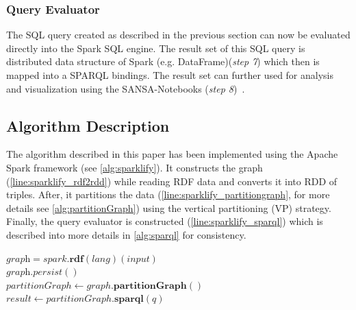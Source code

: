 \subsubsection{Query Evaluator}
The SQL query created as described in the previous section can now be evaluated directly into the Spark SQL engine.
The result set of this SQL query is distributed data structure of Spark (e.g. DataFrame)(\textit{step 7}) which then is mapped into a SPARQL bindings.
The result set can further used for analysis and visualization using the SANSA-Notebooks (\textit{step 8})~\cite{iermilov-2017-sansa-iswc-demo}.

\subsection{Algorithm Description}
\label{subsection:algorithm}
The algorithm described in this paper has been implemented using the Apache Spark framework (see \autoref{alg:sparklify}).
It constructs the graph (\autoref{line:sparklify_rdf2rdd}) while reading RDF data and converts it into RDD of triples.
After, it partitions the data (\autoref{line:sparklify_partitiongraph}, for more details see \autoref{alg:partitionGraph}) using the vertical partitioning (VP) strategy.
Finally, the query evaluator is constructed (\autoref{line:sparklify_sparql}) which is described into more details in \autoref{alg:sparql} for consistency.

\begin{algorithm}[t]
\caption{Sparklify algorithm.}
\label{alg:sparklify}
    $\textit{graph} = spark.\textbf{rdf}(lang)(input)$ \label{line:sparklify_rdf2rdd}\\
    $\textit{graph}.persist()$\\
    $partitionGraph \leftarrow graph.\textbf{partitionGraph}()$ \label{line:sparklify_partitiongraph}\\
    $result \leftarrow partitionGraph.\textbf{sparql}(q)$ \label{line:sparklify_sparql}\\
\end{algorithm}

